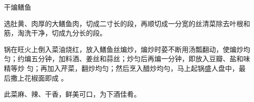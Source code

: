 \begin{recipe}{干煸鳝鱼}

\ingredients


\cooking

\step 选肚黄、肉厚的大鳝鱼肉，切成二寸长的段，再顺切成一分宽的丝清菜除去叶根和
筋，淘洗干净，切成九分长的段。

\step 锅在旺火上倒入菜油烧红，放入鳝鱼丝煸炒，煸炒时荽不断用汤瓢翻动，使煸炒均
匀；约煸五分钟，加料酒、姜丝和蒜丝；炒匀后再煸一分钟，即放入豆瓣、盐和味精等炒
匀；再加入芹菜，翻炒均匀；然后烹入醋炒均勻，马上起锅盛人盘中，最后撒上花椒面即成
。

\notes

此菜麻、辣、干香，鲜美可口，为下酒佳肴。

\end{recipe}

